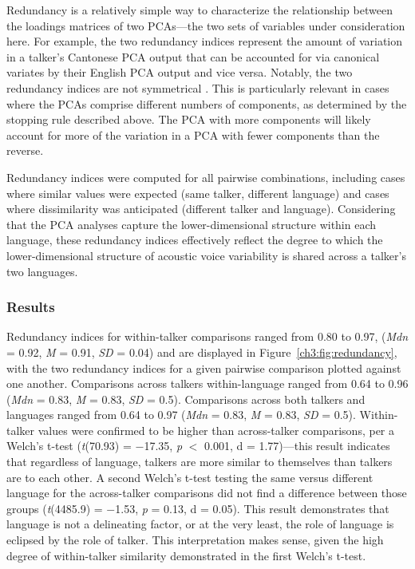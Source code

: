 Redundancy is a relatively simple way to characterize the relationship between the loadings matrices of two PCAs---the two sets of variables under consideration here. For example, the two redundancy indices represent the amount of variation in a talker's Cantonese PCA output that can be accounted for via canonical variates by their English PCA output and vice versa. Notably, the two redundancy indices are not symmetrical \citep{stewart_1968_canonical}. This is particularly relevant in cases where the PCAs comprise different numbers of components, as determined by the stopping rule described above. The PCA with more components will likely account for more of the variation in a PCA with fewer components than the reverse.

Redundancy indices were computed for all pairwise combinations, including cases where similar values were expected (same talker, different language) and cases where dissimilarity was anticipated (different talker and language). Considering that the PCA analyses capture the lower-dimensional structure within each language, these redundancy indices effectively reflect the degree to which the lower-dimensional structure of acoustic voice variability is shared across a talker's two languages.

\subsubsection{Results}

Redundancy indices for within-talker comparisons ranged from 0.80 to 0.97, (\textit{Mdn} = 0.92, \textit{M} = 0.91, \textit{SD} = 0.04) and are displayed in Figure~\ref{ch3:fig:redundancy}, with the two redundancy indices for a given pairwise comparison plotted against one another. Comparisons across talkers within-language ranged from 0.64 to 0.96 (\textit{Mdn} = 0.83, \textit{M} = 0.83, \textit{SD} = 0.5). Comparisons across both talkers and languages ranged from 0.64 to 0.97 (\textit{Mdn} = 0.83, \textit{M} = 0.83, \textit{SD} = 0.5). Within-talker values were confirmed to be higher than across-talker comparisons, per a Welch's t-test (\textit{t}(70.93) = $-$17.35, \textit{p} $<$ 0.001, d = 1.77)---this result indicates that regardless of language, talkers are more similar to themselves than talkers are to each other. A second Welch's t-test testing the same versus different language for the across-talker comparisons did not find a difference between those groups (\textit{t}(4485.9) = $-$1.53, \textit{p} = 0.13, d = 0.05). This result demonstrates that language is not a delineating factor, or at the very least, the role of language is eclipsed by the role of talker. This interpretation makes sense, given the high degree of within-talker similarity demonstrated in the first Welch's t-test. 

